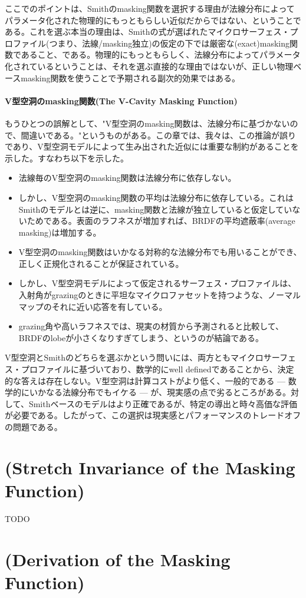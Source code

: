 \documentclass[a4j,xelatex,ja=standard]{bxjsarticle}
\begin{document}
ここでのポイントは、Smithのmasking関数を選択する理由が法線分布によってパラメータ化された物理的にもっともらしい近似だからではない、ということである。これを選ぶ本当の理由は、Smithの式が選ばれたマイクロサーフェス・プロファイル(つまり、法線/masking独立)の仮定の下では厳密な(exact)masking関数であること、である。物理的にもっともらしく、法線分布によってパラメータ化されているということは、それを選ぶ直接的な理由ではないが、正しい物理ベースmasking関数を使うことで予期される副次的効果ではある。

\paragraph{V型空洞のmasking関数(The V-Cavity Masking Function)}

もうひとつの誤解として、"V型空洞のmasking関数は、法線分布に基づかないので、間違いである。"というものがある。この章では、我々は、この推論が誤りであり、V型空洞モデルによって生み出された近似には重要な制約があることを示した。すなわち以下を示した。

\begin{itemize}
    \item 法線毎のV型空洞のmasking関数は法線分布に依存しない。
    \item しかし、V型空洞のmasking関数の平均は法線分布に依存している。これはSmithのモデルとは逆に、masking関数と法線が独立していると仮定していないためである。表面のラフネスが増加すれば、BRDFの平均遮蔽率(average masking)は増加する。
    \item V型空洞のmasking関数はいかなる対称的な法線分布でも用いることができ、正しく正規化されることが保証されている。
    \item しかし、V型空洞モデルによって仮定されるサーフェス・プロファイルは、入射角がgrazingのときに平坦なマイクロファセットを持つような、ノーマルマップのそれに近い応答を有している。
    \item grazing角や高いラフネスでは、現実の材質から予測されると比較して、BRDFのlobeが小さくなりすぎてしまう、というのが結論である。
\end{itemize}

V型空洞とSmithのどちらを選ぶかという問いには、両方ともマイクロサーフェス・プロファイルに基づいており、数学的にwell definedであることから、決定的な答えは存在しない。V型空洞は計算コストがより低く、一般的である --- 数学的にいかなる法線分布でもイケる --- が、現実感の点で劣るところがある。対して、Smithベースのモデルはより正確であるが、特定の導出と時々高価な評価が必要である。したがって、この選択は現実感とパフォーマンスのトレードオフの問題である。

\section{(Stretch Invariance of the Masking Function)}

TODO

\appendix

\section{(Derivation of the Masking Function)}
\label{sec:A}
\end{document}
